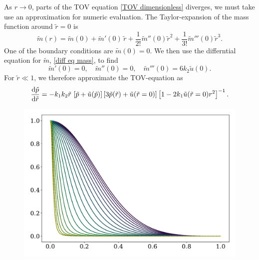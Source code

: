 As $r \rightarrow 0$, parts of the TOV equation \autoref{TOV dimensionless} diverges, we must take use an approximation for numeric evaluation.
The Taylor-expansion of the mass function around $\tilde r = 0$ is
%
\begin{equation}
    \tilde m(r) = \tilde m(0) + \tilde m'(0) \, \tilde r + \frac{1}{2!} \tilde m''(0) \tilde r^2
    + \frac{1}{3!} \tilde m'''(0) \tilde r^3.
\end{equation}
%
One of the boundary conditions are $\tilde m(0) = 0$.
We then use the differntial equation for $\tilde m$, \autoref{diff eq mass}, to find
%
\begin{equation}
    \tilde m'(0) = 0, \quad
    \tilde m''(0) = 0, \quad
    \tilde m'''(0) = 6 k_2 \tilde u(0).
\end{equation}
%
For $\tilde r \ll 1$, we therefore approximate the TOV-equation as
%
\begin{equation}
    \diff{\tilde p}{\tilde r} 
    = - k_1 k_2 \tilde r \, \left[\tilde p + \tilde u(\tilde p)\right]
    \left[ 3 \tilde p(\tilde r) + \tilde u(\tilde r = 0)  \right]
    \left[1 - 2 k_1 \tilde u(\tilde r = 0) r^2\right]^{-1}.
\end{equation}
%


\begin{figure}
    \centering
    \includegraphics[width=\textwidth]{../scripts/figurer/pressure.pdf}
\end{figure}

